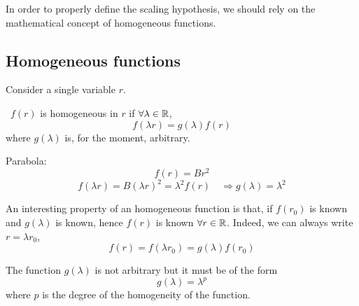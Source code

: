 \documentclass[../main/main.tex]{subfiles}
\begin{document}
In order to properly define the scaling hypothesis, we should rely on the mathematical concept of homogeneous functions.

\subsection{Homogeneous functions}
Consider a single variable \( r \).
\begin{definition} \
\( f(r) \) is homogeneous in \( r \) if \( \forall \lambda \in \mathbb{R} \),
\begin{equation}
  f (\lambda r) = g (\lambda ) f(r)
\end{equation}
where \( g(\lambda ) \) is, for the moment, arbitrary.
\end{definition}
\begin{example}{}{}
  Parabola:
\begin{equation}
  f(r) = B r^2
\end{equation}
\begin{equation}
  f ( \lambda r) = B ( \lambda r)^2 = \lambda ^2 f (r) \quad \Rightarrow g ( \lambda ) = \lambda ^2
\end{equation}
\end{example}
\begin{remark}
An interesting property of an homogeneous function is that, if \( f(r_0) \) is known and \( g(\lambda ) \) is known, hence \( f(r) \) is known \( \forall r \in \mathbb{R} \).
Indeed, we can always write \( r=\lambda r_0 \),
\begin{equation}
  f(r) = f (\lambda r_0) = g(\lambda ) f(r_0)
\end{equation}
\end{remark}
\begin{theorem}[]
  The function \( g(\lambda ) \) is not arbitrary but it must be of the form
\begin{equation}
  g(\lambda ) = \lambda ^p
\end{equation}
where \( p \) is the degree of the homogeneity of the function.
\end{theorem}
\end{document}
